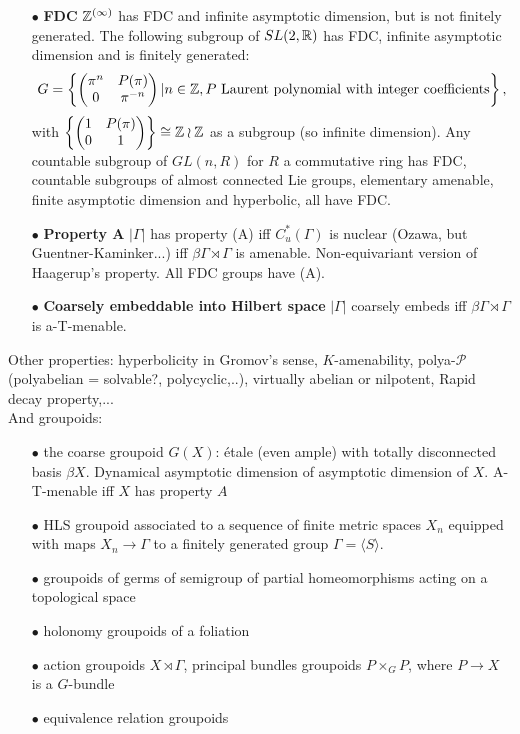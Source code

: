 \begin{itemize}
\item[$\bullet$] \textbf{FDC} $\mathbb Z^{(\infty)}$ has FDC and infinite asymptotic dimension, but is not finitely generated. The following subgroup of $SL(2,\mathbb R)$ has FDC, infinite asymptotic dimension and is finitely generated:  
\[G= \left\{\begin{pmatrix} \pi^n  & P(\pi) \\ 0 & \pi^{-n}\end{pmatrix} | n\in \mathbb Z, P \text{ Laurent polynomial with integer coefficients}\right\},\]
with $\left\{\begin{pmatrix} 1  & P(\pi) \\ 0 & 1\end{pmatrix} \right\} \cong \mathbb Z \wr \mathbb Z $ as a subgroup (so infinite dimension). Any countable subgroup of $GL(n,R)$ for $R$ a commutative ring has FDC, countable subgroups of almost connected Lie groups, elementary amenable, finite asymptotic dimension and hyperbolic, all have FDC.
\\

\item[$\bullet$] \textbf{Property A} $|\Gamma|$ has property (A) iff $C_u^*(\Gamma)$ is nuclear (Ozawa, but Guentner-Kaminker...) iff $\beta \Gamma \rtimes \Gamma$ is amenable. Non-equivariant version of Haagerup's property. All FDC groups have (A).\\
\item[$\bullet$] \textbf{Coarsely embeddable into Hilbert space} $|\Gamma|$ coarsely embeds iff $\beta \Gamma \rtimes \Gamma$ is a-T-menable.\\
\end{itemize}

Other properties: hyperbolicity in Gromov's sense, $K$-amenability, polya-$\mathcal P$ (polyabelian = solvable?, polycyclic,..), virtually abelian or nilpotent, Rapid decay property,...\\

And groupoids:
\begin{itemize}
\item[$\bullet$] the coarse groupoid $G(X)$: \'etale (even ample) with totally disconnected basis $\beta X$. Dynamical asymptotic dimension of asymptotic dimension of $X$. A-T-menable iff $X$ has property $A$
\item[$\bullet$] HLS groupoid associated to a sequence of finite metric spaces $X_n$ equipped with maps $X_n \rightarrow \Gamma$ to a finitely generated group $\Gamma = \langle S \rangle$. 
\item[$\bullet$] groupoids of germs of semigroup of partial homeomorphisms acting on a topological space
\item[$\bullet$] holonomy groupoids of a foliation
\item[$\bullet$] action groupoids $X\rtimes \Gamma$, principal bundles groupoids $P\times_G P$, where $P \rightarrow X$ is a $G$-bundle
\item[$\bullet$] equivalence relation groupoids
\end{itemize}

